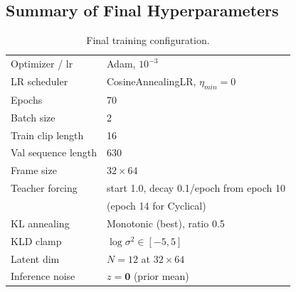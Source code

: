 \documentclass[10pt,twocolumn,letterpaper]{article}
\begin{document}
\subsection{Summary of Final Hyperparameters}

\begin{table}[h]
\centering
\small
\begin{tabular}{ll}
\toprule
Optimizer / lr      & Adam, $10^{-3}$ \\
LR scheduler        & CosineAnnealingLR, $\eta_{min}=0$ \\
Epochs              & 70 \\
Batch size          & 2 \\
Train clip length   & 16 \\
Val sequence length & 630 \\
Frame size          & $32 \times 64$ \\
Teacher forcing     & start 1.0, decay 0.1/epoch from epoch 10 \\
                    & (epoch 14 for Cyclical) \\
KL annealing        & Monotonic (best), ratio 0.5 \\
KLD clamp           & $\log\sigma^2 \in [-5, 5]$ \\
Latent dim          & $N{=}12$ at $32 \times 64$ \\
Inference noise     & $z = \mathbf{0}$ (prior mean) \\
\bottomrule
\end{tabular}
\caption{Final training configuration.}
\label{tab:hparams}
\end{table}

{\small
    
    
}
\end{document}
